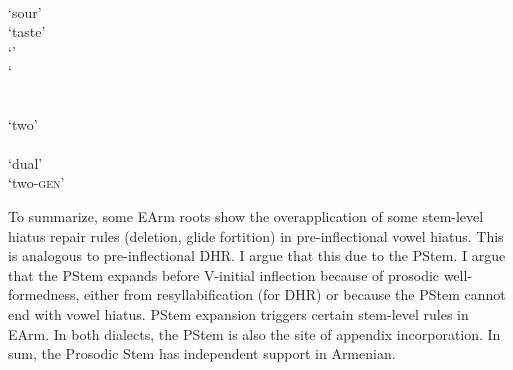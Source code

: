 \begin{exe}
	
	\ex 
	\begin{multicols}{2}
		\begin{xlist}
			
			\ex {}\label{dissexample: hiatus ea u inf: v}\\
			`sour'\\
			`taste'\\
			`'\\
			`
			
			\ex {}\label{dissexample: hiatus ea u inf: epenthesis}\\
			`two'\\\\
			`dual'\\
			`two-\textsc{gen}'
		\end{xlist}
		
	\end{multicols}
	
\end{exe}




To summarize, some EArm roots show the overapplication of  some stem-level hiatus repair rules (deletion, glide fortition)  in pre-inflectional vowel hiatus. This is analogous to pre-inflectional DHR. I argue that this due to the PStem.  I argue that the PStem expands before V-initial inflection   because of prosodic well-formedness, either from resyllabification (for DHR) or because the PStem cannot end   with vowel hiatus. PStem expansion triggers certain stem-level rules in EArm. In both dialects, the PStem is also  the site of appendix incorporation.  In sum, the Prosodic Stem   has independent support in Armenian. %




